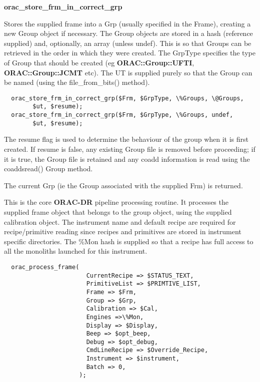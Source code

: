 \begin{description}
\item \textbf{\textbf{orac\_store\_frm\_in\_correct\_grp}}

Stores the supplied frame into a Grp (usually specified in the Frame),
creating a new Group object if necessary. The Group objects are stored
in a hash (reference supplied) and, optionally, an array (unless undef).
This is so that Groups can be retrieved in the order in which they
were created. The GrpType specifies the type of Group that should be
created (eg \textbf{ORAC::Group::UFTI}, \textbf{ORAC::Group::JCMT} etc). The UT
is supplied purely so that the Group can be named (using the 
file\_from\_bits() method).

\begin{verbatim}
  orac_store_frm_in_correct_grp($Frm, $GrpType, \%Groups, \@Groups,
        $ut, $resume);
  orac_store_frm_in_correct_grp($Frm, $GrpType, \%Groups, undef, 
        $ut, $resume);
\end{verbatim}


The resume flag is used to determine the behaviour of the group when
it is first created. If resume is false, any existing Group file is 
removed before proceeding; if it is true, the Group file is retained
and any coadd information is read using the coaddsread() Group
method.



The current Grp (ie the Group associated with the supplied Frm)
is returned.

\item[\textbf{orac\_process\_frame}] \mbox{}

This is the core \textbf{ORAC-DR} pipeline processing routine.
It processes the supplied frame object that belongs to the group object,
using the supplied calibration object. The instrument name and default
recipe are required for recipe/primitive reading since recipes and
primitives are stored in instrument specific directories.
The \%Mon hash is supplied so that a recipe has full access to
all the monoliths launched for this instrument.

\begin{verbatim}
  orac_process_frame(
                       CurrentRecipe => $STATUS_TEXT,
                       PrimitiveList => $PRIMTIVE_LIST,
                       Frame => $Frm,
                       Group => $Grp,
                       Calibration => $Cal,
                       Engines =>\%Mon,
                       Display => $Display,
                       Beep => $opt_beep,
                       Debug => $opt_debug,
                       CmdLineRecipe => $Override_Recipe,
                       Instrument => $instrument,
                       Batch => 0,
                     );
\end{verbatim}



\end{description}
